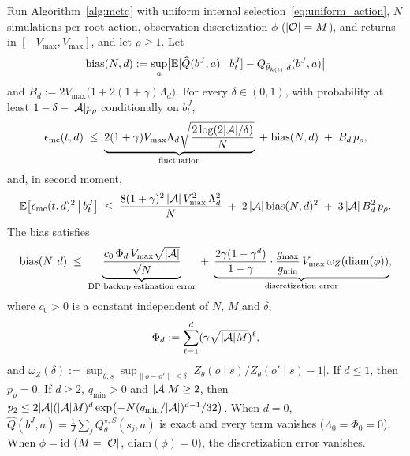 \begin{prop}\label{prop:mc_concentration}
Run Algorithm~\ref{alg:mctq} with uniform internal selection~\eqref{eq:uniform_action}, $N$ simulations per root action, observation discretization $\phi$ ($|\bar{{\mathcal{O}}}|=M$), and returns in $[-V_{\max},V_{\max}]$, and let $\rho\ge1$.
Let
\begin{equation}\label{eq:bias_def}
\mathrm{bias}(N,d):=\sup_{a}\bigl|\mathbb{E}[\widehat Q(b^J,a)\mid b_t^J]-Q_{\bar\theta_{k(t)},d}(b^J,a)\bigr|
\end{equation}
and $B_d:=2V_{\max}\bigl(1+2(1+\gamma)\Lambda_d\bigr)$.
For every $\delta\in(0,1)$, with probability at least $1-\delta-|{\mathcal{A}}|p_\rho$ conditionally on $b_t^J$,
\begin{equation}\label{eq:mc_hp}
\epsilon_{\mathrm{mc}}(t,d)
\;\le\;
\underbrace{2(1+\gamma)V_{\max}\Lambda_d\sqrt{\frac{2\log(2|{\mathcal{A}}|/\delta)}{N}}}_{\text{fluctuation}}
\;+\;\mathrm{bias}(N,d)\;+\;B_d\,p_\rho,
\end{equation}
and, in second moment,
\begin{equation}\label{eq:mc_var_bias}
\mathbb{E}\bigl[\epsilon_{\mathrm{mc}}(t,d)^2\,\big|\,b_t^J\bigr]
\;\le\;
\frac{8(1+\gamma)^2\,|{\mathcal{A}}|\,V_{\max}^2\,\Lambda_d^2}{N}
\;+\;
2\,|{\mathcal{A}}|\,\mathrm{bias}(N,d)^2
\;+\;
3\,|{\mathcal{A}}|\,B_d^2\,p_\rho.
\end{equation}
The bias satisfies
\begin{equation}\label{eq:bias_explicit}
\mathrm{bias}(N,d)
\;\le\;
\underbrace{\frac{c_0\,\Phi_d\,V_{\max}\sqrt{|{\mathcal{A}}|}}{\sqrt{N}}}_{\text{DP backup estimation error}}
\;+\;
\underbrace{\frac{2\gamma(1-\gamma^d)}{1-\gamma}\cdot\frac{g_{\max}}{g_{\min}}\,V_{\max}\,\omega_Z(\mathrm{diam}(\phi))}_{\text{discretization error}},
\end{equation}
where $c_0>0$ is a constant independent of $N$, $M$ and $\delta$,
\begin{equation}\label{eq:Phi_d_def}
\Phi_d:=\sum_{\ell=1}^{d}(\gamma\sqrt{|{\mathcal{A}}|M})^\ell,
\end{equation}
and $\omega_Z(\delta):=\sup_{\theta,s}\sup_{\|o-o'\|\le\delta}|Z_\theta(o\mid s)/Z_\theta(o'\mid s)-1|$.
If $d\le1$, then $p_\rho=0$.
If $d\ge2$, $q_{\min}>0$ and $|{\mathcal{A}}|M\ge2$, then $p_2\le2|{\mathcal{A}}|(|{\mathcal{A}}|M)^d\exp\bigl(-N(q_{\min}/|{\mathcal{A}}|)^{d-1}/32\bigr)$.
When $d=0$, $\widehat Q(b^J,a)=\frac1J\sum_{j}Q_\theta^{\star,S}(s_j,a)$ is exact and every term vanishes ($\Lambda_0=\Phi_0=0$).
When $\phi=\mathrm{id}$ ($M=|{\mathcal{O}}|$, $\mathrm{diam}(\phi)=0$), the discretization error vanishes.
\end{prop}

